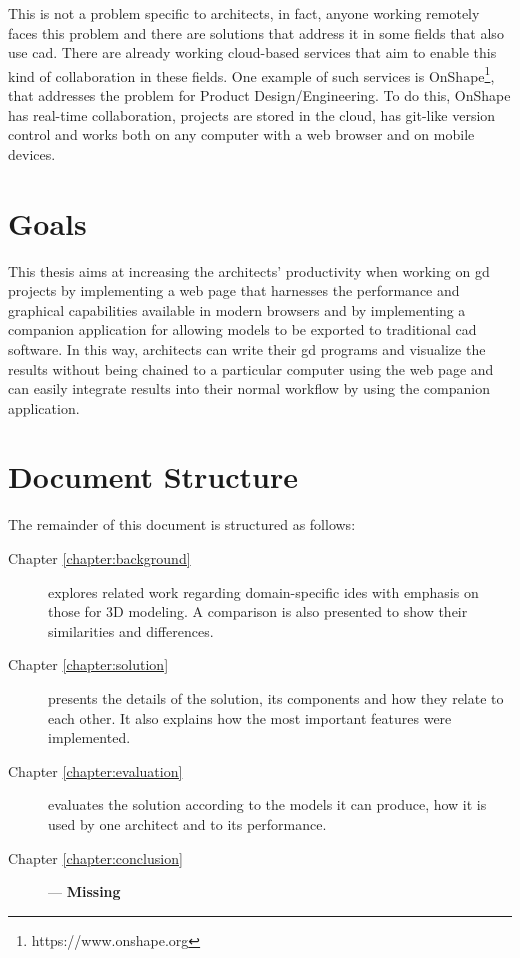 This is not a problem specific to architects, in fact, anyone working remotely faces this problem and there are solutions that address it in some fields that also use \gls{cad}.
There are already working cloud-based services that aim to enable this kind of collaboration in these fields.
One example of such services is OnShape\footnote{https://www.onshape.org}, that addresses the problem for Product Design/Engineering.
To do this, OnShape has real-time collaboration, projects are stored in the cloud, has git-like version control and works both on any computer with a web browser and on mobile devices.


\section{Goals}
This thesis aims at increasing the architects' productivity when working on \gls{gd} projects by implementing a web page that harnesses the performance and graphical capabilities available in modern browsers and by implementing a companion application for allowing models to be exported to traditional \gls{cad} software.
In this way, architects can write their \gls{gd} programs and visualize the results without being chained to a particular computer using the web page and can easily integrate results into their normal workflow by using the companion application.


\section{Document Structure}
The remainder of this document is structured as follows:
\begin{description}
  \item[Chapter \ref{chapter:background}] explores related work regarding domain-specific \glspl{ide} with emphasis on those for 3D modeling. A comparison is also presented to show their similarities and differences.
  \item[Chapter \ref{chapter:solution}] presents the details of the solution, its components and how they relate to each other. It also explains how the most important features were implemented.
  \item[Chapter \ref{chapter:evaluation}] evaluates the solution according to the models it can produce, how it is used by one architect and to its performance.
  \item[Chapter \ref{chapter:conclusion}] --- {\bf Missing }
\end{description}


